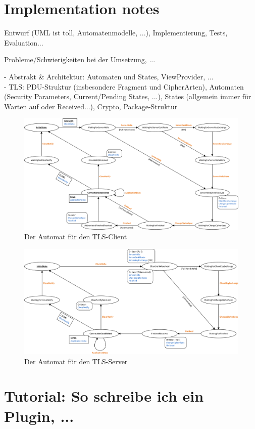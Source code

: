 \section{Implementation notes}

\begin{mdframed}
Entwurf (UML ist toll, Automatenmodelle, ...), Implementierung, Tests, Evaluation...

Probleme/Schwierigkeiten bei der Umsetzung, ...

- Abstrakt \& Architektur: Automaten und States, ViewProvider, ...\\
- TLS: PDU-Struktur (insbesondere Fragment und CipherArten), Automaten (Security Parameters, Current/Pending States, ...), States (allgemein immer für Warten auf oder Received...), Crypto, Package-Struktur
\end{mdframed}

\begin{figure}[H]
	\centering
	\includegraphics[scale=0.75, angle = 90]{Diagrams/client_state_machine.png} %
	\caption{Der Automat für den TLS-Client}
	\label{fig_tls_client_state_machine}
\end{figure}

\begin{figure}[H]
	\centering
	\includegraphics[scale=0.75, angle = 90]{Diagrams/server_state_machine.png} %
	\caption{Der Automat für den TLS-Server}
	\label{fig_tls_server_state_machine}
\end{figure}

\section{Tutorial: So schreibe ich ein Plugin, ...}
